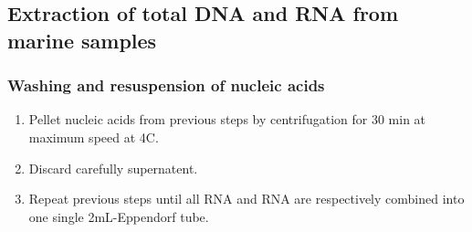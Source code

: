 \subsection{Extraction of total DNA and RNA from marine samples}
\label{task:20180113_cj0}


\subsubsection{Washing and resuspension of nucleic acids}

\begin{enumerate}
\item Pellet nucleic acids from previous steps by centrifugation for 30 min at maximum speed at 4\degree C.
\item Discard carefully supernatent.
\item Repeat previous steps until all RNA and RNA are respectively combined into one single 2mL-Eppendorf tube.
\end{enumerate}
